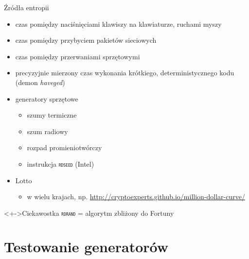 \documentclass{mp}
\begin{document}
\begin{frame}{Źródła entropii}
\begin{itemize}
\item<+-> czas pomiędzy naciśnięciami klawiszy na klawiaturze, ruchami myszy
\item<+-> czas pomiędzy przybyciem pakietów sieciowych
\item<+-> czas pomiędzy przerwaniami sprzętowymi
\item<+-> precyzyjnie mierzony czas wykonania krótkiego, deterministycznego kodu (demon \emph{haveged})
\item<+-> generatory sprzętowe
\begin{itemize}
\item<+-> szumy termiczne
\item<+-> szum radiowy
\item<+-> rozpad promieniotwórczy
\item<+-> instrukcja \texttt{\textsc{rdseed}} (Intel)
\end{itemize}
\item<+-> Lotto
\begin{itemize}
\item<+-> w wielu krajach, np. \url{http://cryptoexperts.github.io/million-dollar-curve/}
\end{itemize}
\end{itemize}
\begin{block}<+->{Ciekawostka}
\texttt{\textsc{rdrand}} = algorytm zbliżony do Fortuny
\end{block}
\end{frame}

\section{Testowanie generatorów}
\end{document}
